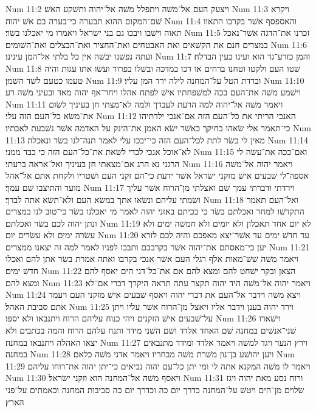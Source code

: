 Num 11:2  ויצעק העם אל־משׁה ויתפלל משׁה אל־יהוה ותשׁקע האשׁ׃
Num 11:3  ויקרא שׁם־המקום ההוא תבערה כי־בערה בם אשׁ יהוה׃
Num 11:4  והאספסף אשׁר בקרבו התאוו תאוה וישׁבו ויבכו גם בני ישׂראל ויאמרו מי יאכלנו בשׂר׃
Num 11:5  זכרנו את־הדגה אשׁר־נאכל במצרים חנם את הקשׁאים ואת האבטחים ואת־החציר ואת־הבצלים ואת־השׁומים׃
Num 11:6  ועתה נפשׁנו יבשׁה אין כל בלתי אל־המן עינינו׃
Num 11:7  והמן כזרע־גד הוא ועינו כעין הבדלח׃
Num 11:8  שׁטו העם ולקטו וטחנו ברחים או דכו במדכה ובשׁלו בפרור ועשׂו אתו עגות והיה טעמו כטעם לשׁד השׁמן׃
Num 11:9  וברדת הטל על־המחנה לילה ירד המן עליו׃
Num 11:10  וישׁמע משׁה את־העם בכה למשׁפחתיו אישׁ לפתח אהלו ויחר־אף יהוה מאד ובעיני משׁה רע׃
Num 11:11  ויאמר משׁה אל־יהוה למה הרעת לעבדך ולמה לא־מצתי חן בעיניך לשׂום את־משׂא כל־העם הזה עלי׃
Num 11:12  האנכי הריתי את כל־העם הזה אם־אנכי ילדתיהו כי־תאמר אלי שׂאהו בחיקך כאשׁר ישׂא האמן את־הינק על האדמה אשׁר נשׁבעת לאבתיו׃
Num 11:13  מאין לי בשׂר לתת לכל־העם הזה כי־יבכו עלי לאמר תנה־לנו בשׂר ונאכלה׃
Num 11:14  לא־אוכל אנכי לבדי לשׂאת את־כל־העם הזה כי כבד ממני׃
Num 11:15  ואם־ככה את־עשׂה לי הרגני נא הרג אם־מצאתי חן בעיניך ואל־אראה ברעתי׃
Num 11:16  ויאמר יהוה אל־משׁה אספה־לי שׁבעים אישׁ מזקני ישׂראל אשׁר ידעת כי־הם זקני העם ושׁטריו ולקחת אתם אל־אהל מועד והתיצבו שׁם עמך׃
Num 11:17  וירדתי ודברתי עמך שׁם ואצלתי מן־הרוח אשׁר עליך ושׂמתי עליהם ונשׂאו אתך במשׂא העם ולא־תשׂא אתה לבדך׃
Num 11:18  ואל־העם תאמר התקדשׁו למחר ואכלתם בשׂר כי בכיתם באזני יהוה לאמר מי יאכלנו בשׂר כי־טוב לנו במצרים ונתן יהוה לכם בשׂר ואכלתם׃
Num 11:19  לא יום אחד תאכלון ולא יומים ולא חמשׁה ימים ולא עשׂרה ימים ולא עשׂרים יום׃
Num 11:20  עד חדשׁ ימים עד אשׁר־יצא מאפכם והיה לכם לזרא יען כי־מאסתם את־יהוה אשׁר בקרבכם ותבכו לפניו לאמר למה זה יצאנו ממצרים׃
Num 11:21  ויאמר משׁה שׁשׁ־מאות אלף רגלי העם אשׁר אנכי בקרבו ואתה אמרת בשׂר אתן להם ואכלו חדשׁ ימים׃
Num 11:22  הצאן ובקר ישׁחט להם ומצא להם אם את־כל־דגי הים יאסף להם ומצא להם׃
Num 11:23  ויאמר יהוה אל־משׁה היד יהוה תקצר עתה תראה היקרך דברי אם־לא׃
Num 11:24  ויצא משׁה וידבר אל־העם את דברי יהוה ויאסף שׁבעים אישׁ מזקני העם ויעמד אתם סביבת האהל׃
Num 11:25  וירד יהוה בענן וידבר אליו ויאצל מן־הרוח אשׁר עליו ויתן על־שׁבעים אישׁ הזקנים ויהי כנוח עליהם הרוח ויתנבאו ולא יספו׃
Num 11:26  וישׁארו שׁני־אנשׁים במחנה שׁם האחד אלדד ושׁם השׁני מידד ותנח עלהם הרוח והמה בכתבים ולא יצאו האהלה ויתנבאו במחנה׃
Num 11:27  וירץ הנער ויגד למשׁה ויאמר אלדד ומידד מתנבאים במחנה׃
Num 11:28  ויען יהושׁע בן־נון משׁרת משׁה מבחריו ויאמר אדני משׁה כלאם׃
Num 11:29  ויאמר לו משׁה המקנא אתה לי ומי יתן כל־עם יהוה נביאים כי־יתן יהוה את־רוחו עליהם׃
Num 11:30  ויאסף משׁה אל־המחנה הוא וזקני ישׂראל׃
Num 11:31  ורוח נסע מאת יהוה ויגז שׂלוים מן־הים ויטשׁ על־המחנה כדרך יום כה וכדרך יום כה סביבות המחנה וכאמתים על־פני הארץ׃
